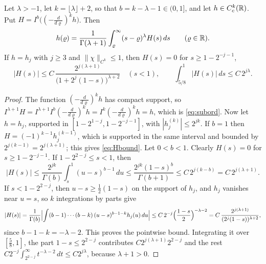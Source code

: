 \begin{lemma}\label{lem:subord}
Let $\lambda>-1$, let $k=\lfloor\lambda\rfloor+2$, so that $b=k-\lambda-1\in(0,1]$, and let $h\in C^k_c(\mathbb{R})$.
Put $H=I^b\bigl((-\tfrac{d}{d\varrho})^kh\bigr)$. Then
\begin{equation}\label{eq:subord}
h(\varrho)=\frac1{\Gamma(\lambda+1)}\int_\varrho^\infty(s-\varrho)^{\lambda}H(s)\,ds\qquad(\varrho\in\mathbb{R}).
\end{equation}
If $h=h_j$ with $j\ge3$ and $\|\chi\|_{C^k}\le1$, then $H(s)=0$ for $s\ge1-2^{-j-1}$,
\begin{equation}\label{eq:Hbound}
|H(s)|\le C\,\frac{2^{j(\lambda+1)}}{\bigl(1+2^j(1-s)\bigr)^{\lambda+2}}\quad(s<1),\qquad
\int_{5/8}^1|H(s)|\,ds\le C\,2^{j\lambda}.
\end{equation}
\end{lemma}

\begin{proof}
The function $(-\frac d{d\varrho})^kh$ has compact support, so
$I^{\lambda+1}H=I^{\lambda+1}I^b(-\tfrac{d}{d\varrho})^kh=I^k(-\tfrac{d}{d\varrho})^kh=h$, which is
\eqref{eq:subord}. Now let $h=h_j$, supported in $[1-2^{1-j},1-2^{-j-1}]$, with
$|h_j^{(k)}|\le2^{jk}$. If $b=1$ then $H=(-1)^{k-1}h_j^{(k-1)}$, which is supported in the same interval
and bounded by $2^{j(k-1)}=2^{j(\lambda+1)}$; this gives \eqref{eq:Hbound}. Let $0<b<1$. Clearly $H(s)=0$ for
$s\ge1-2^{-j-1}$. If $1-2^{2-j}\le s<1$, then
\[
|H(s)|\le\frac{2^{jk}}{\Gamma(b)}\int_s^1(u-s)^{b-1}\,du\le\frac{2^{jk}(1-s)^b}{\Gamma(b+1)}\le C\,2^{j(k-b)}=C\,2^{j(\lambda+1)} .
\]
If $s<1-2^{2-j}$, then $u-s\ge\frac12(1-s)$ on the support of $h_j$, and $h_j$ vanishes near $u=s$, so
$k$ integrations by parts give
\[
|H(s)|=\frac1{\Gamma(b)}\Bigl|\int(b-1)\cdots(b-k)\,(u-s)^{b-1-k}h_j(u)\,du\Bigr|
\le C\,2^{-j}\Bigl(\frac{1-s}2\Bigr)^{-\lambda-2}=C\,\frac{2^{j(\lambda+1)}}{(2^j(1-s))^{\lambda+2}} ,
\]
since $b-1-k=-\lambda-2$. This proves the pointwise bound. Integrating it over $[\frac58,1]$, the part
$1-s\le2^{2-j}$ contributes $C2^{j(\lambda+1)}2^{2-j}$ and the rest
$C2^{-j}\int_{2^{2-j}}^{\infty}t^{-\lambda-2}\,dt\le C2^{j\lambda}$, because $\lambda+1>0$.
\end{proof}

